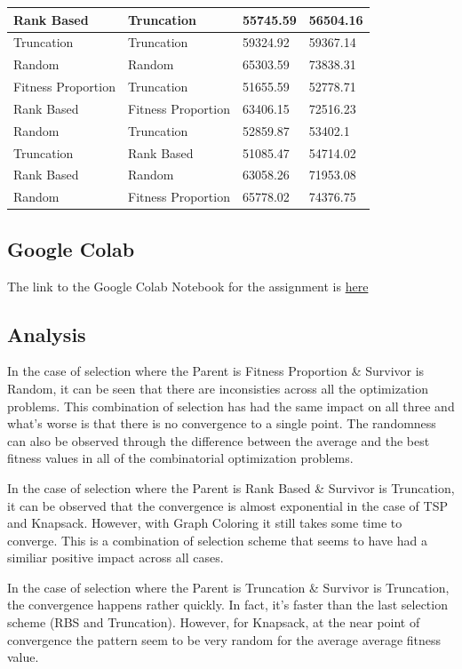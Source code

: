 \documentclass[11pt, letterpaper]{article}
\begin{document}
\begin{table}[H]
\begin{tabular}{|l|l|l|l|}
        Rank Based & Truncation & 55745.59 & 56504.16 \\ \hline
        Truncation & Truncation & 59324.92 & 59367.14 \\ \hline
        Random & Random & 65303.59 & 73838.31 \\ \hline
        Fitness Proportion & Truncation & 51655.59 & 52778.71 \\ \hline
        Rank Based & Fitness Proportion & 63406.15 & 72516.23 \\ \hline
        Random & Truncation & 52859.87 & 53402.1 \\ \hline
        Truncation & Rank Based & 51085.47 & 54714.02 \\ \hline
        Rank Based & Random & 63058.26 & 71953.08 \\ \hline
        Random & Fitness Proportion & 65778.02 & 74376.75 \\ \hline
    \end{tabular}
\end{table}

\newpage
\subsection {Google Colab}
The link to the Google Colab Notebook for the assignment is \href{https://colab.research.google.com/drive/1AgRRDJZLwOUPDDmhBcisCZp-pijTVeMK?usp=sharing}{here}
\subsection {Analysis}

In the case of selection where the Parent is Fitness Proportion \& Survivor is Random, it can be seen that there are inconsisties across all the optimization problems. This combination of selection has had the same impact on all three and what's worse is that there is no convergence to a single point. The randomness can also be observed through the difference between the average and the best fitness values in all of the combinatorial optimization problems.

In the case of selection where the Parent is Rank Based \& Survivor is Truncation, it can be observed that the convergence is almost exponential in the case of TSP and Knapsack. However, with Graph Coloring it still takes some time to converge. This is a combination of selection scheme that seems to have had a similiar positive impact across all cases.

In the case of selection where the Parent is Truncation \& Survivor is Truncation, the convergence happens rather quickly. In fact, it's faster than the last selection scheme (RBS and Truncation). However, for Knapsack, at the near point  of convergence the pattern seem to be very random for the average average fitness value.
\end{document}
